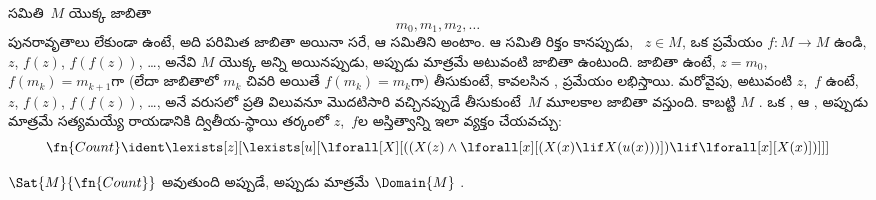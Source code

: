 \documentclass[../../../include/open-logic-section]{subfiles}
\begin{document}
సమితి~$M$ యొక్క  జాబితా
\[
m_0, m_1, m_2, \dots
\]
పునరావృతాలు లేకుండా ఉంటే, అది పరిమిత జాబితా అయినా సరే, ఆ సమితిని
 అంటాం. ఆ సమితి రిక్తం కానప్పుడు,
~$z \in M$, ఒక ప్రమేయం
$f\colon M \to M$ ఉండి, $z$, $f(z)$, $f(f(z))$, \dots, అనేవి
$M$ యొక్క అన్ని  అయినప్పుడు, అప్పుడు మాత్రమే అటువంటి
జాబితా ఉంటుంది. జాబితా ఉంటే, $z = m_0$, $f(m_k) = m_{k+1}$గా
(లేదా జాబితాలో $m_k$ చివరి  అయితే $f(m_k) = m_k$గా)
తీసుకుంటే, కావలసిన , ప్రమేయం లభిస్తాయి. మరోవైపు, అటువంటి
$z$,~$f$ ఉంటే, $z$, $f(z)$, $f(f(z))$, \dots, అనే వరుసలో ప్రతి విలువనూ
మొదటిసారి వచ్చినప్పుడే తీసుకుంటే~$M$ మూలకాల జాబితా వస్తుంది. కాబట్టి $M$ . ఒక , ఆ
 , అప్పుడు మాత్రమే సత్యమయ్యే 
రాయడానికి ద్వితీయ-స్థాయి తర్కంలో $z$,~$f$ల అస్తిత్వాన్ని
ఇలా వ్యక్తం చేయవచ్చు:
\[
\fn{Count} \ident
\lexists[z][\lexists[u][\lforall[X][((X(z) \land
      \lforall[x][(X(x) \lif X(u(x)))]) \lif \lforall[x][X(x)])]]]
\]

\begin{prop}
$\Sat{M}{\fn{Count}}$ అవుతుంది అప్పుడే, అప్పుడు మాత్రమే $\Domain{M}$
.
\end{prop}
\end{document}
